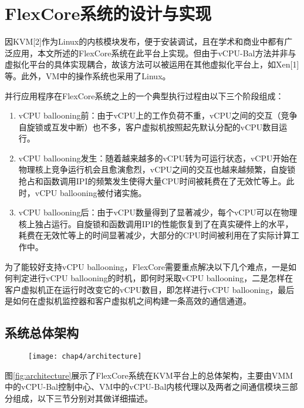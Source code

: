 \section{FlexCore系统的设计与实现}

因KVM[2]作为Linux的内核模块发布，便于安装调试，且在学术和商业中都有广泛应用，本文所述的FlexCore系统在此平台上实现。但由于vCPU-Bal方法并非与虚拟化平台的具体实现耦合，故该方法可以被运用在其他虚拟化平台上，如Xen[1]等。此外，VM中的操作系统也采用了Linux。

并行应用程序在FlexCore系统之上的一个典型执行过程由以下三个阶段组成：

\begin{enumerate}
\item vCPU ballooning前：由于vCPU上的工作负荷不重，vCPU之间的交互（竞争自旋锁或互发中断）也不多，客户虚拟机按照起先默认分配的vCPU数目运行。
\item vCPU ballooning发生：随着越来越多的vCPU转为可运行状态，vCPU开始在物理核上竞争运行机会且愈演愈烈，vCPU之间的交互也越来越频繁，自旋锁抢占和函数调用IPI的频繁发生使得大量CPU时间被耗费在了无效忙等上。此时，vCPU ballooning被付诸实施。
\item vCPU ballooning后：由于vCPU数量得到了显著减少，每个vCPU可以在物理核上独占运行。自旋锁和函数调用IPI的性能恢复到了在真实硬件上的水平，耗费在无效忙等上的时间显著减少，大部分的CPU时间被利用在了实际计算工作中。
\end{enumerate}

为了能较好支持vCPU ballooning，FlexCore需要重点解决以下几个难点，一是如何判定进行vCPU ballooning的时机，即何时采取vCPU ballooning，二是怎样在客户虚拟机正在运行时改变它的vCPU数目，即怎样进行vCPU ballooning，最后是如何在虚拟机监控器和客户虚拟机之间构建一条高效的通信通道。

\subsection{系统总体架构}

\begin{figure}[!htp]
  \centering
  \texttt{[image: chap4/architecture]}
\end{figure}

图\ref{fig:architecture}展示了FlexCore系统在KVM平台上的总体架构，主要由VMM中的vCPU-Bal控制中心、VM中的vCPU-Bal内核代理以及两者之间通信模块三部分组成，以下三节分别对其做详细描述。

